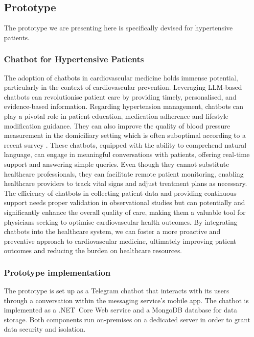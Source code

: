 \subsection{Prototype}\label{subsec:proto}

The prototype we are presenting here is specifically devised for hypertensive patients.
\subsubsection{Chatbot for Hypertensive Patients}

The adoption of chatbots in cardiovascular medicine holds immense potential, particularly in the context of cardiovascular prevention. 
%
Leveraging LLM-based chatbots can revolutionise patient care by providing timely, personalised, and evidence-based information. 
%
Regarding hypertension management, chatbots can play a pivotal role in patient education, medication adherence and lifestyle modification guidance. 
%
They can also improve the quality of blood pressure measurement in the domiciliary setting which is often suboptimal according to a recent survey \cite{Mancusi2022}.
%
These chatbots, equipped with the ability to comprehend natural language, can engage in meaningful conversations with patients, offering real-time support and answering simple queries. 
%
Even though they cannot substitute healthcare professionals, they can facilitate remote patient monitoring, enabling healthcare providers to track vital signs and adjust treatment plans as necessary. 
%
The efficiency of chatbots in collecting patient data and providing continuous support needs proper validation in observational studies but can potentially and significantly enhance the overall quality of care, making them a valuable tool for physicians seeking to optimise cardiovascular health outcomes. 
%
By integrating chatbots into the healthcare system, we can foster a more proactive and preventive approach to cardiovascular medicine, ultimately improving patient outcomes and reducing the burden on healthcare resources.

\subsubsection{Prototype implementation}
%
The prototype is set up as a Telegram chatbot that interacts with its users through a conversation within the messaging service's mobile app.
%
The chatbot is implemented as a .NET~Core Web service and a MongoDB database for data storage.
Both components run on-premises on a dedicated server in order to grant data security and isolation.

